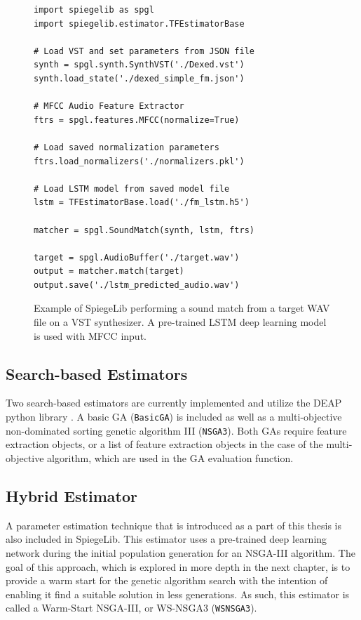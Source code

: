 \begin{figure}[t]
\centering
\footnotesize
\begin{verbatim}
import spiegelib as spgl
import spiegelib.estimator.TFEstimatorBase

# Load VST and set parameters from JSON file
synth = spgl.synth.SynthVST('./Dexed.vst')
synth.load_state('./dexed_simple_fm.json')

# MFCC Audio Feature Extractor
ftrs = spgl.features.MFCC(normalize=True)

# Load saved normalization parameters
ftrs.load_normalizers('./normalizers.pkl')

# Load LSTM model from saved model file
lstm = TFEstimatorBase.load('./fm_lstm.h5')

matcher = spgl.SoundMatch(synth, lstm, ftrs)

target = spgl.AudioBuffer('./target.wav')
output = matcher.match(target)
output.save('./lstm_predicted_audio.wav')
\end{verbatim}
\caption{Example of SpiegeLib performing a sound match from a target WAV file on a VST synthesizer. A pre-trained LSTM deep learning model is used with MFCC input.}
\label{fig:lstm_code}
\end{figure} 

\subsection{Search-based Estimators}
Two search-based estimators are currently implemented and utilize the DEAP python library \cite{fortin2012deap}. A basic GA (\texttt{BasicGA}) is included as well as a multi-objective non-dominated sorting genetic algorithm III (\texttt{NSGA3}). Both GAs require feature extraction objects, or a list of feature extraction objects in the case of the multi-objective algorithm, which are used in the GA evaluation function.

\subsection{Hybrid Estimator}
A parameter estimation technique that is introduced as a part of this thesis is also included in SpiegeLib. This estimator uses a pre-trained deep learning network during the initial population generation for an NSGA-III algorithm. The goal of this approach, which is explored in more depth in the next chapter, is to provide a warm start for the genetic algorithm search with the intention of enabling it find a suitable solution in less generations. As such, this estimator is called a Warm-Start NSGA-III, or WS-NSGA3 (\texttt{WSNSGA3}).

